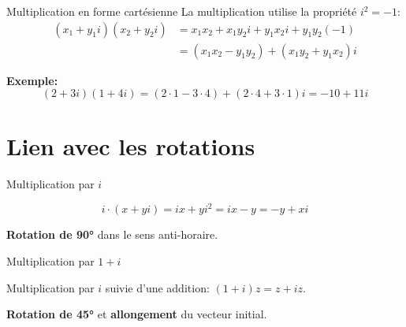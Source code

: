 \documentclass[aspectratio=169,12pt]{beamer}
\begin{document}
\begin{frame}{Multiplication en forme cartésienne}
  La multiplication utilise la propriété $i^2 = -1$:
  \begin{align*}
    (x_1 + y_1 i)(x_2 + y_2 i) 
    &= x_1 x_2 + x_1 y_2 i + y_1 x_2 i + y_1 y_2 (-1) \\
    &= (x_1 x_2 - y_1 y_2) + (x_1 y_2 + y_1 x_2)i
  \end{align*}
  
  \bigskip
  \textbf{Exemple:}
  \[
    (2 + 3i)(1 + 4i) = (2 \cdot 1 - 3 \cdot 4) + (2 \cdot 4 + 3 \cdot 1)i = -10 + 11i
  \]
\end{frame}

\section{Lien avec les rotations}

\begin{frame}{Multiplication par $i$}

  \vspace{-5mm}
  \[
    i \cdot (x + yi) = ix + yi^2 = ix - y = -y + xi
  \]
  
  \begin{center}
  \end{center}
  
  \textbf{Rotation de 90°} dans le sens anti-horaire.
\end{frame}

\begin{frame}{Multiplication par $1+i$}

  Multiplication par $i$ suivie d'une addition: $(1 + i)z = z + iz$.

  \begin{center}
  \end{center}
  
  \textbf{Rotation de 45°} et \textbf{allongement} du vecteur initial.
\end{frame}
\end{document}
